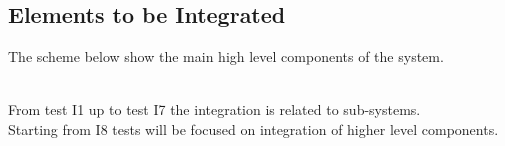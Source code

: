 \documentclass[a4paper,11pt]{report} %
\begin{document}
	\subsection{Elements to be Integrated}
		The scheme below show the main high level components of the system.\\
			\begin{minipage}{\linewidth}
			\end{minipage}
			\bigskip \\
			From test I1 up to test I7 the integration is related to sub-systems.\\
			Starting from I8 tests will be focused on integration of higher level components.
\end{document}
